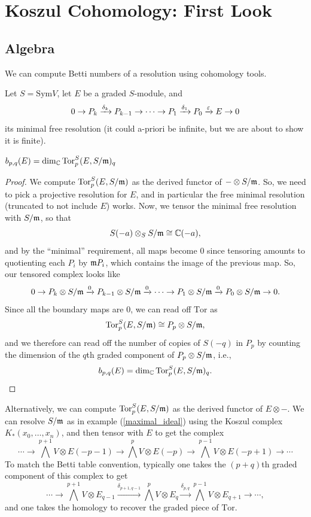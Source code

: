 \documentclass[12pt]{article}
\newcommand{\Sym}{\mathrm{Sym}}
\newcommand{\Tor}{\mathrm{Tor}}
\begin{document}
\section{Koszul Cohomology: First Look}

\subsection{Algebra}

We can compute Betti numbers of a resolution using cohomology tools.

Let $S=\Sym V$, let $E$ be a graded $S$-module, and
\[0 \to P_k \xrightarrow{\delta_k} P_{k-1} \to \cdots \to P_1 \xrightarrow{\delta_1} P_0 \xrightarrow{\varepsilon} E \to 0\]
its minimal free resolution (it could a-priori be infinite, but we are about to show it is finite).

\begin{prop}
    $b_{p,q}(E) = \dim_\C \Tor_p^S(E, S/\fm)_{q}$
\end{prop}

\begin{proof}
    We compute $\Tor_p^S(E,S/\fm)$ as the derived functor of $-\otimes S/\mathfrak{m}$. So, we need to pick a projective resolution for $E$, and in particular the free minimal resolution (truncated to not include $E$) works. Now, we tensor the minimal free resolution with $S/\mathfrak{m}$, so that
    \[S(-a) \otimes_S S/\mathfrak{m} \cong \mathbb{C}(-a),\]
    and by the ``minimal'' requirement, all maps become $0$ since tensoring amounts to quotienting each $P_i$ by $\mathfrak{m} P_i$, which contains the image of the previous map. So, our tensored complex looks like
    \[0 \to P_k \otimes S/\mathfrak{m} \xrightarrow{0} P_{k-1} \otimes S/\mathfrak{m} \xrightarrow{0} \cdots \to P_1 \otimes S/\mathfrak{m} \xrightarrow{0} P_0 \otimes S/\mathfrak{m} \to 0.\]
    Since all the boundary maps are $0$, we can read off $\Tor$ as
    \[\Tor_p^S(E,S/\fm) \cong P_p \otimes S/\fm,\]
    and we therefore can read off the number of copies of $S(-q)$ in $P_p$ by counting the dimension of the $q$th graded component of $P_p \otimes S/\mathfrak{m}$, i.e.,
    \[b_{p,q}(E) = \dim_\C \Tor_p^S(E,S/\fm)_q.\]
\end{proof}

Alternatively, we can compute $\Tor_p^S(E,S/\fm)$ as the derived functor of $E\otimes -$. We can resolve $S/\mathfrak{m}$ as in example (\ref{maximal_ideal}) using the Koszul complex $K_*(x_0,\dots,x_n)$, and then tensor with $E$ to get the complex
\[\cdots \to \bigwedge^{p+1} V \otimes E(-p-1) \to \bigwedge^p V \otimes E(-p) \to \bigwedge^{p-1} V \otimes E(-p+1) \to \cdots\]
To match the Betti table convention, typically one takes the $(p+q)$th graded component of this complex to get
\[\cdots \to \bigwedge^{p+1} V \otimes E_{q-1} \xrightarrow{\delta_{p+1,q-1}} \bigwedge^p V \otimes E_q \xrightarrow{\delta_{p,q}} \bigwedge^{p-1} V \otimes E_{q+1} \to \cdots,\]
and one takes the homology to recover the graded piece of $\Tor$.
\end{document}
